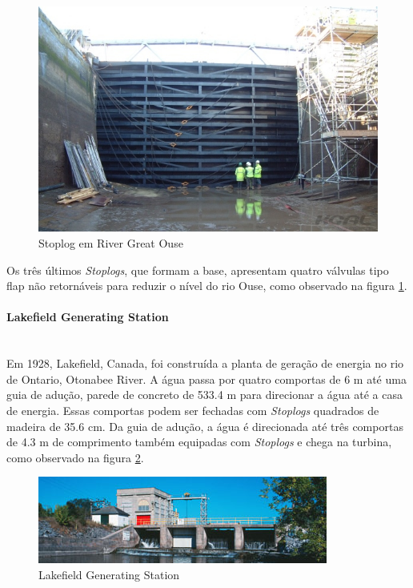 \begin{figure}[H]
    \centering
    \includegraphics[width=1\columnwidth]{figs/pesqbib/2.jpg}
    \caption{Stoplog em River Great Ouse}
    \label{pesqbib_2}
\end{figure}
 
Os três últimos \emph{Stoplogs}, que formam a base, apresentam quatro válvulas
tipo flap não retornáveis para reduzir o nível do rio
Ouse, como observado na figura
\ref{pesqbib_2}.

\paragraph{Lakefield Generating Station}\mbox{}\\
Em 1928, Lakefield, Canada, foi construída a planta de geração de energia no rio
de Ontario, Otonabee River. A água passa por quatro comportas de 6 m até uma
guia de adução, parede de concreto de 533.4 m para direcionar a água até a casa
de energia. Essas comportas podem ser fechadas com \emph{Stoplogs} quadrados de 
madeira de 35.6 cm. Da guia de adução, a água é direcionada até três comportas 
de 4.3 m de comprimento também equipadas com \emph{Stoplogs} e chega na
turbina, como observado na figura \ref{pesqbib_3}.

\begin{figure}[H]
    \centering
    \includegraphics[width=1\columnwidth]{figs/pesqbib/3.jpg}
    \caption{Lakefield Generating Station}
    \label{pesqbib_3}
\end{figure}
 
